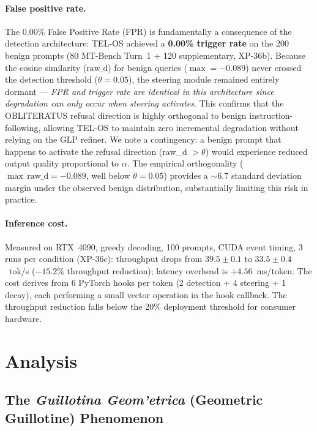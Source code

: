 \documentclass{article}
\begin{document}
\paragraph{False positive rate.}
The 0.00\% False Positive Rate (FPR) is fundamentally a consequence of the
detection architecture: TEL-OS achieved a \textbf{0.00\% trigger rate} on the
200 benign prompts (80 MT-Bench Turn~1 + 120 supplementary, XP-36b).
Because the cosine similarity ($\text{raw\_d}$) for benign queries
($\max = {-0.089}$) never crossed the detection threshold ($\theta = 0.05$),
the steering module remained entirely dormant --- \textit{FPR and trigger rate are
identical in this architecture since degradation can only occur when steering activates}.
This confirms that the OBLITERATUS refusal direction is highly orthogonal to
benign instruction-following, allowing TEL-OS to maintain zero incremental
degradation without relying on the GLP refiner.
We note a contingency: a benign prompt that happens to activate the refusal direction
(raw\_d $> \theta$) would experience reduced output quality proportional to $\alpha$.
The empirical orthogonality ($\max\,\text{raw\_d} = {-0.089}$, well below $\theta=0.05$)
provides a $\sim$6.7 standard deviation margin under the observed benign distribution,
substantially limiting this risk in practice.

\paragraph{Inference cost.}
Measured on RTX~4090, greedy decoding, 100 prompts, CUDA event timing, 3 runs
per condition (XP-36c):
throughput drops from $39.5 \pm 0.1$ to $33.5 \pm 0.4$~tok/s
($-15.2\%$ throughput reduction); latency overhead is $+4.56$~ms/token.
The cost derives from 6 PyTorch hooks per token (2 detection + 4 steering +
1 decay), each performing a small vector operation in the hook callback.
The throughput reduction falls below the 20\% deployment threshold for
consumer hardware.

\section{Analysis}
\label{sec:analysis}

\subsection{The \textit{Guillotina Geom'{e}trica} (Geometric Guillotine) Phenomenon}
\label{subsec:guillotina}
\end{document}
